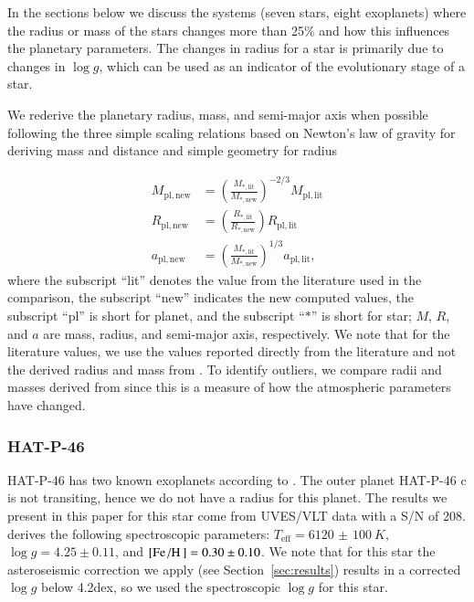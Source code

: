 \documentclass{aa}
\begin{document}
In the sections below we discuss the systems (seven stars, eight exoplanets)
where the radius or mass of the stars changes more than 25\% and how this
influences the planetary parameters. The changes in radius for a star is
primarily due to changes in $\log g$, which can be used as an indicator of the
evolutionary stage of a star.

We rederive the planetary radius, mass, and semi-major axis when possible
following the three simple scaling relations based on Newton's law of gravity
\citep{Newton1687} for deriving mass and distance and simple geometry for radius
\citep[see e.g.][]{Torres2008}

\begin{align}
    M_\mathrm{pl,new} &= \left(\frac{M_\mathrm{\ast,lit}}{M_\mathrm{\ast,new}}\right)^{-2/3} M_\mathrm{pl,lit}  \\
    R_\mathrm{pl,new} &= \left(\frac{R_\mathrm{\ast,lit}}{R_\mathrm{\ast,new}}\right) R_\mathrm{pl,lit} \\
    a_\mathrm{pl,new} &= \left(\frac{M_\mathrm{\ast,lit}}{M_\mathrm{\ast,new}}\right)^{1/3} a_\mathrm{pl,lit},
\end{align}
where the subscript ``lit'' denotes the value from the literature used in the
comparison, the subscript ``new'' indicates the new computed values, the
subscript ``pl'' is short for planet, and the subscript ``$\ast$'' is short for
star; $M$, $R$, and $a$ are mass, radius, and semi-major axis, respectively. We
note that for the literature values, we use the values reported directly from
the literature and not the derived radius and mass from \citet{Torres2010}. To
identify outliers, we compare radii and masses derived from \citet{Torres2010}
since this is a measure of how the atmospheric parameters have changed.

\subsubsection{HAT-P-46}
\label{sub:HAT-P-46}
HAT-P-46 has two known exoplanets according to \citet{Hartmann2014}. The outer
planet HAT-P-46 c is not transiting, hence we do not have a radius for this
planet. The results we present in this paper for this star come from UVES/VLT
data with a S/N of 208. \citet{Hartmann2014} derives the following spectroscopic
parameters: $T_\mathrm{eff}=\SI{6120(100)}{K}$, $\log g=4.25\pm0.11$, and
$[\ion{Fe}/\ion{H}]=0.30\pm0.10$. We note that for this star the asteroseismic
correction we apply (see Section~\ref{sec:results}) results in a corrected $\log
g$ below 4.2dex, so we used the spectroscopic $\log g$ for this star.
\end{document}
